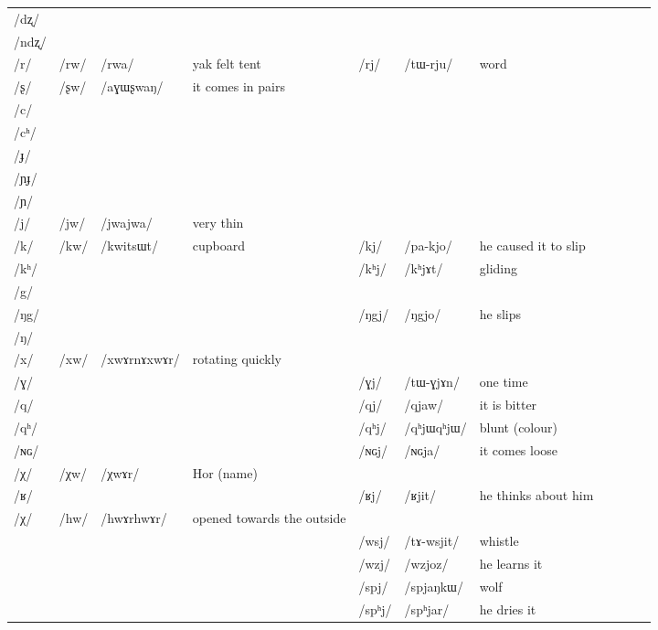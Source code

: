 \documentclass[oldfontcommands,oneside,a4paper,11pt]{article}
\newcommand{\ipa}[1]{{\phon/#1/}} %
\newcommand{\deux}[1]{/#1/}
\newcommand{\trois}[1]{/#1/}
\newcommand{\tib}[1]{\cellcolor{lightgray}\textbf{#1}}
\newcommand{\idph}[1]{\cellcolor{gray}\textbf{#1}}
\begin{document}
\begin{table}
{\begin{tabular}{l|lll|lll|lll|l}
\ipa{dʐ} 	& 	& 	&	& 	& 	&\\	
\ipa{ndʐ} 	& 	& 	&	& 	& 	&\\	
\ipa{r} 	&\deux{rw}\tib{} 	&\ipa{rwa} 	&yak felt tent	&\deux{rj} 	&\ipa{tɯ-rju} 	&word \\	
\ipa{ʂ} 	&\deux{ʂw} \tib{}	&\ipa{aɣɯʂwaŋ} 	&it comes in pairs	& 	& 	&\\	
\ipa{c} 	& 	& 	&	& 	& 	&\\	
\ipa{cʰ} 	& 	& 	&	& 	& 	&\\	
\ipa{ɟ} 	& 	& 	&	& 	& 	&\\	
\ipa{ɲɟ} 	& 	& 	&	& 	& 	&\\	
\ipa{ɲ} 	& 	& 	&	& 	& 	&\\	
\ipa{j} 	&\deux{jw} 	&\ipa{jwajwa} 	&very thin	& 	& 	&\\	
\ipa{k} 	&\deux{kw}\tib{} 	&\ipa{kwitsɯt} 	&cupboard	&\deux{kj} 	&\ipa{pa-kjo} 	&he caused it to slip\\	
\ipa{kʰ} 	&  	& 	&	&  	\deux{kʰj} \idph{}& \ipa{kʰjɤt} 	& gliding\\	
\ipa{g} 	& 	& 	&	& 	& 	&\\	
\ipa{ŋg} 	& 	& 	&	&\deux{ŋgj} 	&\ipa{ŋgjo} 	&he slips\\	
\ipa{ŋ} 	& 	& 	&	& 	& 	&\\	
\ipa{x} 	&\deux{xw}\idph{} 	& 	\ipa{xwɤrnɤxwɤr}& rotating quickly	& 	& 	&\\	
\ipa{ɣ} 	& 	& 	&	&\deux{ɣj} 	&\ipa{tɯ-ɣjɤn} 	&one time\\	
\ipa{q} 	& 	& 	&	&\deux{qj} 	&\ipa{qjaw} 	&it is bitter\\	
\ipa{qʰ} 	& 	& 	&	&\deux{qʰj} \idph{}	&\ipa{qʰjɯqʰjɯ} 	&blunt (colour)\\	
\ipa{ɴɢ} 	& 	& 	&	&\deux{ɴɢj} 	&\ipa{ɴɢja} 	&it comes loose\\	
\ipa{χ} 	&\deux{χw} \tib{}	&\ipa{χwɤr} 	&Hor (name)	& 	& 	&\\	
\ipa{ʁ} 	& 	& 	&	&\deux{ʁj} 	&\ipa{ʁjit} 	&he thinks about 	
him\\
\ipa{χ} 	&\deux{hw} \idph{}	&\ipa{hwɤrhwɤr} 	&opened towards the outside	& 	& 	&\\	
\midrule
 		& 		&		&		&\trois{wsj} 		&\ipa{tɤ-wsjit} 		&whistle\\
 		& 		&		&		&\trois{wzj}  \tib{}		&\ipa{wzjoz}  		&he learns it\\
\midrule												
 		& 		&		&		&\trois{spj} 		&\ipa{spjaŋkɯ} 		&wolf\\
 		& 		&		&		&\trois{spʰj} 		&\ipa{spʰjar} 		& he dries it\\

\end{tabular}}
\end{table}
\end{document}
